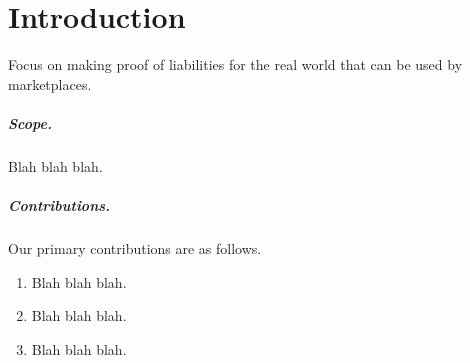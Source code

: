
\chapter{Introduction}

Focus on making proof of liabilities for the real world that can be used by marketplaces.
 

\paragraph{Scope.} 
Blah blah blah.


\paragraph{Contributions.} 
Our primary contributions are as follows.

\begin{enumerate}

\item Blah blah blah.

\item Blah blah blah. 

\item Blah blah blah. 

\end{enumerate}

